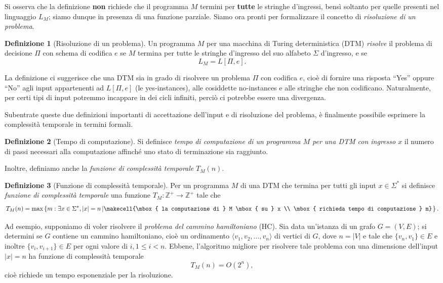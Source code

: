 \documentclass[10pt]{\classname}
\theoremstyle{newlinethm}
\theoremstyle{theorem}
\theoremstyle{definition}
\newtheorem{definizione}{Definizione}[section]
\theoremstyle{definition}
\theoremstyle{definition}
\theoremstyle{definition}
\begin{document}
Si osserva che la definizione \textbf{non} richiede che il programma $M$ termini per \textbf{tutte} le stringhe d'ingressi, bensì soltanto per quelle presenti nel linguaggio $L_M$; siamo dunque in presenza di una funzione parziale. Siamo ora pronti per formalizzare il concetto di \emph{risoluzione di un problema}.
\begin{definizione}[Risoluzione di un problema]
    Un programma $M$ per una macchina di Turing deterministica (DTM) \emph{risolve} il problema di decisione $\Pi$ con schema di codifica $e$ se $M$ termina per tutte le stringhe d'ingresso del suo alfabeto $\Sigma$ d'ingresso, e se \[L_M = L[\Pi, e].\]
\end{definizione}
La definizione ci suggerisce che una DTM sia in grado di risolvere un problema $\Pi$ con codifica $e$, cioè di fornire una risposta ``Yes'' oppure ``No'' agli input appartenenti ad $L[\Pi, e]$ (le yes-instances), alle cosiddette no-instances e alle stringhe che non codificano. Naturalmente, per certi tipi di input potremmo incappare in dei cicli infiniti, perciò ci potrebbe essere una divergenza.

Subentrate queste due definizioni importanti di accettazione dell'input e di risoluzione del problema, è finalmente possibile esprimere la complessità temporale in termini formali.
\begin{definizione}[Tempo di computazione]
    Si definisce \emph{tempo di computazione di un programma $M$ per una DTM con ingresso $x$} il numero di passi necessari alla computazione affinché uno stato di terminazione sia raggiunto.
\end{definizione}
Inoltre, definiamo anche la \emph{funzione di complessità temporale} $T_M(n)$.
\begin{definizione}[Funzione di complessità temporale]
    Per un programma $M$ di una DTM che termina per tutti gli input $x \in \Sigma^*$ si definisce \emph{funzione di complessità temporale} una funzione $T_M : \mathbb Z^+ \rightarrow \mathbb Z^+$ tale che \[T_M(n) = \max \left\{m : \exists x \in \Sigma^*, |x| = n \left|\makecell{\mbox{ la computazione di } M \mbox{ su } x \\ \mbox{ richieda tempo di computazione } m}\right.\right\}.\]
\end{definizione}

Ad esempio, supponiamo di voler risolvere il \emph{problema del cammino hamiltoniano} (HC). Sia data un'istanza di un grafo $G = (V,E)$; si determini se $G$ contiene un cammino hamiltoniano, cioè un ordinamento $\langle v_1, v_2, \dots, v_n\rangle$ di vertici di $G$, dove $n = |V|$ e tale che $\{v_n, v_1\} \in E$ e inoltre $\{v_i,v_{i+1}\} \in E$ per ogni valore di $i, 1\leq i < n$. Ebbene, l'algoritmo migliore per risolvere tale problema con una dimensione dell'input $|x| = n$ ha funzione di complessità temporale \[T_M(n) = O(2^n),\] cioè richiede un tempo esponenziale per la risoluzione.
\end{document}
